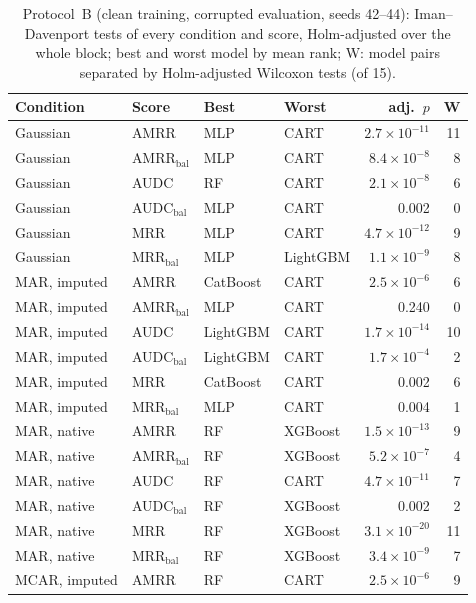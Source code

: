 \documentclass[pdflatex,sn-mathphys]{sn-jnl}
\theoremstyle{thmstyleone}
\begin{document}
\begin{table}[htbp]
\centering
\footnotesize
\caption{Protocol~B (clean training, corrupted evaluation, seeds 42--44): Iman--Davenport tests of every condition and score, Holm-adjusted over the whole block; best and worst model by mean rank; W: model pairs separated by Holm-adjusted Wilcoxon tests (of 15).}
\label{tab:protocolb_tests}
\begin{tabular}{@{}llllrr@{}}
\toprule
Condition & Score & Best & Worst & adj.\ $p$ & W \\
\midrule
Gaussian & AMRR & MLP & CART & $2.7\times10^{-11}$ & 11 \\
Gaussian & AMRR$_{\mathrm{bal}}$ & MLP & CART & $8.4\times10^{-8}$ & 8 \\
Gaussian & AUDC & RF & CART & $2.1\times10^{-8}$ & 6 \\
Gaussian & AUDC$_{\mathrm{bal}}$ & MLP & CART & 0.002 & 0 \\
Gaussian & MRR & MLP & CART & $4.7\times10^{-12}$ & 9 \\
Gaussian & MRR$_{\mathrm{bal}}$ & MLP & LightGBM & $1.1\times10^{-9}$ & 8 \\
MAR, imputed & AMRR & CatBoost & CART & $2.5\times10^{-6}$ & 6 \\
MAR, imputed & AMRR$_{\mathrm{bal}}$ & MLP & CART & 0.240 & 0 \\
MAR, imputed & AUDC & LightGBM & CART & $1.7\times10^{-14}$ & 10 \\
MAR, imputed & AUDC$_{\mathrm{bal}}$ & LightGBM & CART & $1.7\times10^{-4}$ & 2 \\
MAR, imputed & MRR & CatBoost & CART & 0.002 & 6 \\
MAR, imputed & MRR$_{\mathrm{bal}}$ & MLP & CART & 0.004 & 1 \\
MAR, native & AMRR & RF & XGBoost & $1.5\times10^{-13}$ & 9 \\
MAR, native & AMRR$_{\mathrm{bal}}$ & RF & XGBoost & $5.2\times10^{-7}$ & 4 \\
MAR, native & AUDC & RF & CART & $4.7\times10^{-11}$ & 7 \\
MAR, native & AUDC$_{\mathrm{bal}}$ & RF & XGBoost & 0.002 & 2 \\
MAR, native & MRR & RF & XGBoost & $3.1\times10^{-20}$ & 11 \\
MAR, native & MRR$_{\mathrm{bal}}$ & RF & XGBoost & $3.4\times10^{-9}$ & 7 \\
MCAR, imputed & AMRR & RF & CART & $2.5\times10^{-6}$ & 9 \\

\end{tabular}
\end{table}
\end{document}
